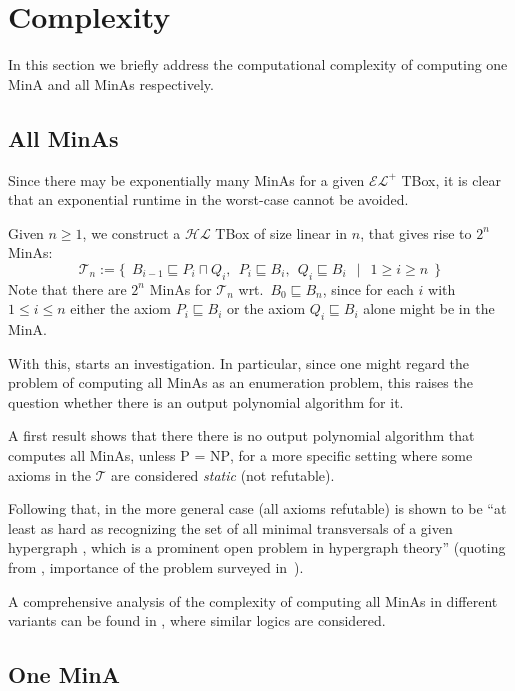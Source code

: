 \documentclass{llncs}
\newcommand{\elp}{\ensuremath{\mathcal{EL^+}}\xspace}
\newcommand{\hl}{\ensuremath{\mathcal{HL}}\xspace}
\newcommand{\tb}{\ensuremath{\mathcal{T}}\xspace} %
\newcommand{\subsume}{\sqsubseteq}
\begin{document}
\section{Complexity}
\label{sec:cmplx}

In this section we briefly address the computational complexity of computing one MinA and all MinAs respectively.

\subsection{All MinAs}
\label{sec:all}

Since there may be exponentially many MinAs for a given \elp TBox, it is clear that an exponential runtime in the worst-case cannot be avoided.

\begin{example}
Given $n \geq 1$, we construct a \hl TBox of size linear in $n$, that gives rise to $2^n$ MinAs: $$\tb_n := \big\{~~B_{i-1} \subsume P_i \sqcap Q_i,~~P_i \subsume B_i,~~Q_i \subsume B_i~~\mid~~1 \geq i \geq n~~\big\}$$ Note that there are $2^n$ MinAs for $\tb_n$ wrt.~$B_0 \subsume B_n$, since for each $i$ with $1 \leq i \leq n$ either the axiom $P_i \subsume B_i$ or the axiom $Q_i \subsume B_i$ alone might be in the MinA.
\end{example}

With this, \cite{orig1,orig2} starts an investigation. In particular, since one might regard the problem of computing all MinAs as an enumeration problem, this raises the question whether there is an output polynomial algorithm for it.

A first result \cite[Thm.~5]{orig1,orig2} shows that there there is no output polynomial algorithm that computes all MinAs, unless \textsc{P} = \textsc{NP}, for a more specific setting where some axioms in the \tb are considered \emph{static} (not refutable).

Following that, in \cite[Thm.~2]{hard} the more general case (all axioms refutable) is shown to be \enquote{at least as hard as recognizing the set of all minimal transversals of a given hypergraph \cite{hypmintrav}, which is a prominent open problem in hypergraph theory} (quoting from \cite{hard}, importance of the problem surveyed in~\cite{hyperai}).

A comprehensive analysis of the complexity of computing all MinAs in different variants can be found in \cite{family}, where similar logics are considered.

\subsection{One MinA}
\label{sec:one}
\end{document}
